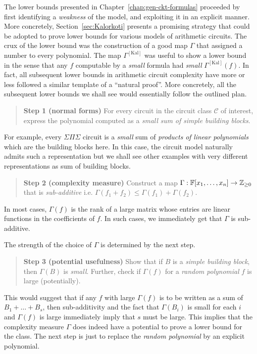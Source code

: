 \documentclass[12pt]{report}
\newcommand{\CM}[1]{\Gamma^{\mathrm{[#1]}}}
\begin{document}
The lower bounds presented in Chapter~\ref{chap:gen-ckt-formulas} proceeded by first identifying a \emph{weakness} of the model, and exploiting it in an explicit manner. More concretely, Section~\ref{sec:Kalorkoti} presents a promising strategy that could be adopted to prove lower bounds for various models of arithmetic circuits. The crux of the lower bound was the construction of a good map $\Gamma$ that assigned a number to every polynomial. The map $\CM{Kal}$ was useful to show a lower bound in the sense that any $f$ computable by a \emph{small} formula had \emph{small} $\CM{Kal}(f)$. In fact, all subsequent lower bounds in arithmetic circuit complexity have more or less followed a similar template of a ``natural proof''. More concretely, all the subsequent lower bounds we shall see would essentially follow the outlined plan.  

\begin{quote}
{\bf Step 1 (normal forms)} For every circuit in the circuit class $\mathcal{C}$ of interest, express the polynomial computed as a \emph{small sum of simple building blocks}. 
\end{quote}

For example, every $\Sigma\Pi\Sigma$ circuit is a \emph{small} sum of \emph{products of linear polynomials} which are the building blocks here. In this case, the circuit model naturally admits such a representation but we shall see other examples with very different representations as sum of building blocks. 

\begin{quote}
{\bf Step 2 (complexity measure)} Construct a map $\Gamma: \mathbb{F}[x_1,\dots, x_n] \rightarrow \mathbb{Z}_{\geq 0}$ that is \emph{sub-additive} i.e. $\Gamma(f_1 + f_2)\leq \Gamma(f_1) + \Gamma(f_2)$.
\end{quote}

In most cases, $\Gamma(f)$ is the rank of a large matrix whose entries are linear functions in the coefficients of $f$. In such cases, we immediately get that $\Gamma$ is sub-additive. 

The strength of the choice of $\Gamma$ is determined by the next step. 

\begin{quote}
{\bf Step 3 (potential usefulness)} Show that if $B$ is a \emph{simple building block}, then $\Gamma(B)$ is \emph{small}.
Further, check if $\Gamma(f)$ for a \emph{random polynomial} $f$ is large (potentially). 
\end{quote}

This would suggest that if any $f$ with large $\Gamma(f)$ is to be written as a sum of $B_1 + \dots + B_s$, then sub-additivity and the fact that $\Gamma(B_i)$ is small for each $i$ and $\Gamma(f)$ is large immediately imply that $s$ must be large. This implies that the complexity measure $\Gamma$ does indeed have a potential to prove a lower bound for the class. The next step is just to replace the \emph{random polynomial} by an explicit polynomial. 
\end{document}

